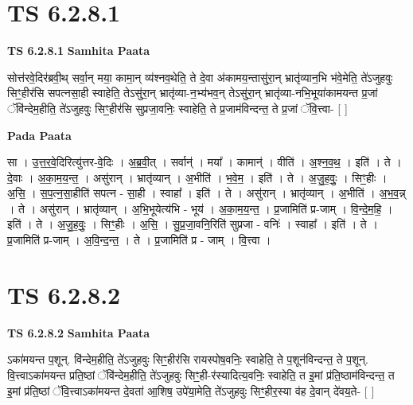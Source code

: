 \documentclass[17pt]{extarticle}
\begin{document}
\section*{ TS 6.2.8.1 }

\textbf{TS 6.2.8.1 } \newline
\textbf{Samhita Paata} \newline

सोत्त॑रवे॒दिर॑ब्रवी॒थ् सर्वा॒न् मया॒ कामा॒न् व्य॑श्नव॒थेति॒ ते दे॒वा अ॑कामय॒न्तासु॑रा॒न् भ्रातृ॑व्यान॒भि भ॑वे॒मेति॒ ते॑ऽजुहवुः सिꣳ॒॒हीर॑सि सपत्नसा॒ही स्वाहेति॒ तेऽसु॑रा॒न् भ्रातृ॑व्या-न॒भ्य॑भव॒न् तेऽसु॑रा॒न् भ्रातृ॑व्या-नभि॒भूया॑कामयन्त प्र॒जां ॅवि॑न्देम॒हीति॒ ते॑ऽजुहवुः सिꣳ॒॒हीर॑सि सुप्रजा॒वनिः॒ स्वाहेति॒ ते प्र॒जाम॑विन्दन्त॒ ते प्र॒जां ॅवि॒त्त्वा- [  ] \newline

\textbf{Pada Paata} \newline

सा । उ॒त्त॒र॒वे॒दिरित्यु॑त्तर-वे॒दिः । अ॒ब्र॒वी॒त् । सर्वान्॑ । मया᳚ । कामान्॑ । वीति॑ । अ॒श्न॒व॒थ॒ । इति॑ । ते । दे॒वाः । अ॒का॒म॒य॒न्त॒ । असु॑रान् । भ्रातृ॑व्यान् । अ॒भीति॑ । भ॒वे॒म॒ । इति॑ । ते । अ॒जु॒ह॒वुः॒ । सिꣳ॒॒हीः । अ॒सि॒ । स॒प॒त्न॒सा॒हीति॑ सपत्न - सा॒ही । स्वाहा᳚ । इति॑ । ते । असु॑रान् । भ्रातृ॑व्यान् । अ॒भीति॑ । अ॒भ॒व॒न्न् । ते । असु॑रान् । भ्रातृ॑व्यान् । अ॒भि॒भूयेत्य॑भि - भूय॑ । अ॒का॒म॒य॒न्त॒ । प्र॒जामिति॑ प्र-जाम् । वि॒न्दे॒म॒हि॒ । इति॑ । ते । अ॒जु॒ह॒वुः॒ । सिꣳ॒॒हीः । अ॒सि॒ । सु॒प्र॒जा॒वनि॒रिति॑ सुप्रजा - वनिः॑ । स्वाहा᳚ । इति॑ । ते । प्र॒जामिति॑ प्र-जाम् । अ॒वि॒न्द॒न्त॒ । ते । प्र॒जामिति॑ प्र - जाम् । वि॒त्त्वा ।  \newline




\section*{ TS 6.2.8.2 }

\textbf{TS 6.2.8.2 } \newline
\textbf{Samhita Paata} \newline

ऽका॑मयन्त प॒शून्. वि॑न्देम॒हीति॒ ते॑ऽजुहवुः सिꣳ॒॒हीर॑सि रायस्पोष॒वनिः॒ स्वाहेति॒ ते प॒शून॑विन्दन्त॒ ते प॒शून्. वि॒त्त्वाऽका॑मयन्त प्रति॒ष्ठां ॅवि॑न्देम॒हीति॒ ते॑ऽजुहवुः सिꣳ॒॒ही-र॑स्यादित्य॒वनिः॒ स्वाहेति॒ त इ॒मां प्र॑ति॒ष्ठाम॑विन्दन्त॒ त इ॒मां प्र॑ति॒ष्ठां ॅवि॒त्त्वाऽका॑मयन्त दे॒वता॑ आ॒शिष॒ उपे॑या॒मेति॒ ते॑ऽजुहवुः सिꣳ॒॒हीर॒स्या व॑ह दे॒वान् दे॑वय॒ते- [  ] \newline
\end{document}
